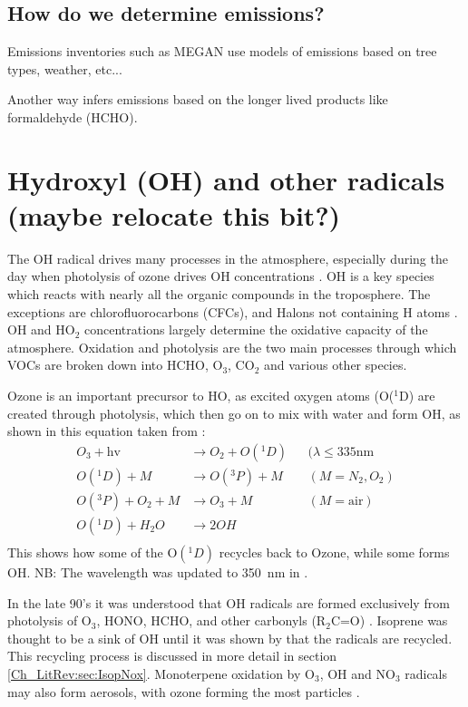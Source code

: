   \subsection{How do we determine emissions?}
    Emissions inventories such as MEGAN use models of emissions based on tree types, weather, etc... 
    
    Another way infers emissions based on the longer lived products like formaldehyde (HCHO).

\section{Hydroxyl (OH) and other radicals (maybe relocate this bit?)} 
    The OH radical drives many processes in the atmosphere, especially during the day when photolysis of ozone drives OH concentrations \citep{Atkinson2000}.    
    OH is a key species which reacts with nearly all the organic compounds in the troposphere.
    The exceptions are chlorofluorocarbons (CFCs), and Halons not containing H atoms \citep{Atkinson2000}.
    OH and HO$_2$ concentrations largely determine the oxidative capacity of the atmosphere.
    Oxidation and photolysis are the two main processes through which VOCs are broken down into HCHO, O$_3$, CO$_2$ and various other species.
    
    Ozone is an important precursor to HO, as excited oxygen atoms (O(${}^1$D) are created through photolysis, which then go on to mix with water and form OH, as shown in this equation taken from \citet{Atkinson2000}:
    \begin{align*}
      O_3 + \text{hv}         & \to  O_2 + O({}^1D)   && (\lambda \le 335 \text{nm} \\%
      O({}^1D) + M            & \to  O({}^3P) + M     && (M=N_2, O_2)               \\%
      O({}^3P) + O_2 + M      & \to  O_3 + M          && (M=\text{air})             \\%
      O({}^1D) + H_2O         & \to  2OH              &&                            \\%
    \end{align*}
    This shows how some of the O$({}^1D)$ recycles back to Ozone, while some forms OH.
    NB: The wavelength was updated to 350~nm in \citet{AtkinsonArey2003}.
    
    In the late 90's it was understood that OH radicals are formed exclusively from photolysis of O$_3$, HONO, HCHO, and other carbonyls (R$_2$C=O) \citet{Atkinson2000}.
    Isoprene was thought to be a sink of OH until it was shown by \cite{Paulot2009b} that the radicals are recycled.
    This recycling process is discussed in more detail in section \ref{Ch_LitRev:sec:IsopNox}.
    Monoterpene oxidation by O$_3$, OH and NO$_3$ radicals may also form aerosols, with ozone forming the most particles \citep{Kanakidou2005}.

